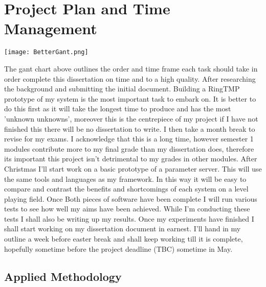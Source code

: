 \clearpage
\section{Project Plan and Time Management}
\texttt{[image: BetterGant.png]}

The gant chart above outlines the order and time frame each task should take in
order complete this dissertation on time and to a high quality. After
researching the background and submitting the initial document. Building a
RingTMP prototype of my system is the most important task to embark on. It is
better to do this first as it will take the longest time to produce and has the
most 'unknown unknowns', moreover this is the centrepiece of my project if I
have not finished this there will be no dissertation to write. I then take a
month break to revise for my exams. I acknowledge that this is a long time,
however semester 1 modules contribute more to my final grade than my
dissertation does, therefore its important this project isn't detrimental to my
grades in other modules. After Christmas I'll start work on a basic prototype of
a parameter server. This will use the same tools and languages as my framework.
In this way it will be easy to compare and contrast the benefits and
shortcomings of each system on a level playing field. Once Both pieces of
software have been complete I will run various tests to see how well my aims
have been achieved. While I'm conducting these tests I shall also be writing up
my results. Once my experiments have finished I shall start working on my
dissertation document in earnest. I'll hand in my outline a week before easter
break and shall keep working till it is complete, hopefully sometime before the
project deadline (TBC) sometime in May.

\subsection{Applied Methodology}

